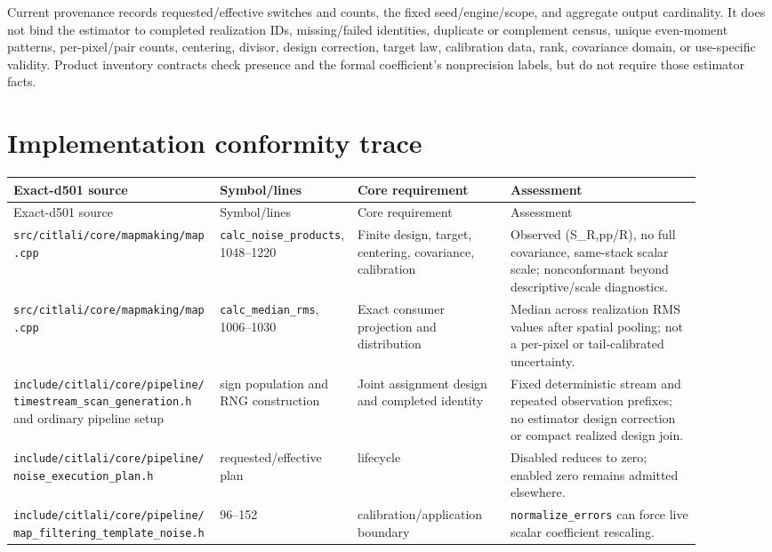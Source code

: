 \documentclass[11pt]{article}
\newcommand{\code}[1]{\nolinkurl{#1}}
\begin{document}
Current provenance records requested/effective switches and counts, the fixed
seed/engine/scope, and aggregate output cardinality.  It does not bind the
estimator to completed realization IDs, missing/failed identities, duplicate
or complement census, unique even-moment patterns, per-pixel/pair counts,
centering, divisor, design correction, target law, calibration data, rank,
covariance domain, or use-specific validity.  Product inventory contracts
check presence and the formal coefficient's nonprecision labels, but do not
require those estimator facts.

\section{Implementation conformity trace}

\begin{longtable}{L{0.27\linewidth}L{0.18\linewidth}L{0.20\linewidth}L{0.25\linewidth}}
\toprule
Exact-d501 source & Symbol/lines & Core requirement & Assessment\\
\midrule
\endfirsthead
\toprule
Exact-d501 source & Symbol/lines & Core requirement & Assessment\\
\midrule
\endhead
\code{src/citlali/core/mapmaking/map.cpp} &
\code{calc_noise_products}, 1048--1220 &
Finite design, target, centering, covariance, calibration &
Observed (S_{R,pp}/R), no full covariance, same-stack scalar scale;
nonconformant beyond descriptive/scale diagnostics.\\
\code{src/citlali/core/mapmaking/map.cpp} &
\code{calc_median_rms}, 1006--1030 &
Exact consumer projection and distribution &
Median across realization RMS values after spatial pooling; not a per-pixel or
tail-calibrated uncertainty.\\
\code{include/citlali/core/pipeline/timestream_scan_generation.h} and ordinary
pipeline setup & sign population and RNG construction &
Joint assignment design and completed identity &
Fixed deterministic stream and repeated observation prefixes; no estimator
design correction or compact realized design join.\\
\code{include/citlali/core/pipeline/noise_execution_plan.h} &
requested/effective plan & lifecycle &
Disabled reduces to zero; enabled zero remains admitted elsewhere.\\
\code{include/citlali/core/pipeline/map_filtering_template_noise.h} &
96--152 & calibration/application boundary &
\code{normalize_errors} can force live scalar coefficient rescaling.\\

\end{longtable}
\end{document}
